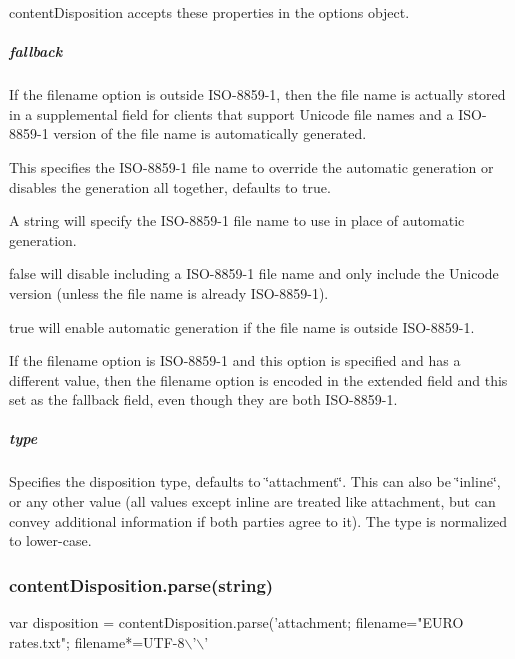 {\ttfamily content\+Disposition} accepts these properties in the options object.

\subparagraph*{fallback}

If the {\ttfamily filename} option is outside I\+S\+O-\/8859-\/1, then the file name is actually stored in a supplemental field for clients that support Unicode file names and a I\+S\+O-\/8859-\/1 version of the file name is automatically generated.

This specifies the I\+S\+O-\/8859-\/1 file name to override the automatic generation or disables the generation all together, defaults to {\ttfamily true}.


\begin{DoxyItemize}
\item A string will specify the I\+S\+O-\/8859-\/1 file name to use in place of automatic generation.
\item {\ttfamily false} will disable including a I\+S\+O-\/8859-\/1 file name and only include the Unicode version (unless the file name is already I\+S\+O-\/8859-\/1).
\item {\ttfamily true} will enable automatic generation if the file name is outside I\+S\+O-\/8859-\/1.
\end{DoxyItemize}

If the {\ttfamily filename} option is I\+S\+O-\/8859-\/1 and this option is specified and has a different value, then the {\ttfamily filename} option is encoded in the extended field and this set as the fallback field, even though they are both I\+S\+O-\/8859-\/1.

\subparagraph*{type}

Specifies the disposition type, defaults to {\ttfamily \char`\"{}attachment\char`\"{}}. This can also be {\ttfamily \char`\"{}inline\char`\"{}}, or any other value (all values except inline are treated like {\ttfamily attachment}, but can convey additional information if both parties agree to it). The type is normalized to lower-\/case.

\subsubsection*{content\+Disposition.\+parse(string)}


\begin{DoxyCode}
var disposition = contentDisposition.parse('attachment; filename="EURO rates.txt";
       filename*=UTF-8\(\backslash\)'\(\backslash\)'%
\end{DoxyCode}


